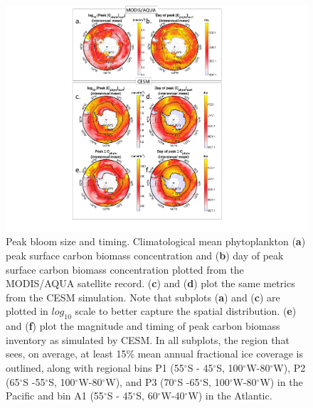 
\begin{figure}[!htbp]
\begin{adjustwidth}{-1in}{-1in}
 \centering
 \includegraphics[scale=.2]{figures/Ch2/Figure_1.jpg}
\end{adjustwidth}
\caption[Peak bloom size and timing]{Peak bloom size and timing.  Climatological mean phytoplankton (\textbf{a}) peak surface carbon biomass concentration and (\textbf{b}) day of peak surface carbon biomass concentration plotted from the MODIS/AQUA satellite record. (\textbf{c}) and (\textbf{d}) plot the same metrics from the CESM simulation. Note that subplots (\textbf{a}) and (\textbf{c}) are plotted in $log_{10}$ scale to better capture the spatial distribution. (\textbf{e}) and (\textbf{f}) plot the magnitude and timing of peak carbon biomass inventory as simulated by CESM. In all subplots, the region that sees, on average, at least 15\% mean annual fractional ice coverage is outlined, along with regional bins P1 (55$^\circ$S - 45$^\circ$S, 100$^\circ$W-80$^\circ$W), P2 (65$^\circ$S -55$^\circ$S, 100$^\circ$W-80$^\circ$W), and P3 (70$^\circ$S -65$^\circ$S, 100$^\circ$W-80$^\circ$W) in the Pacific and bin A1 (55$^\circ$S - 45$^\circ$S, 60$^\circ$W-40$^\circ$W) in the Atlantic.}
\label{fig:Fig1}
\end{figure}





